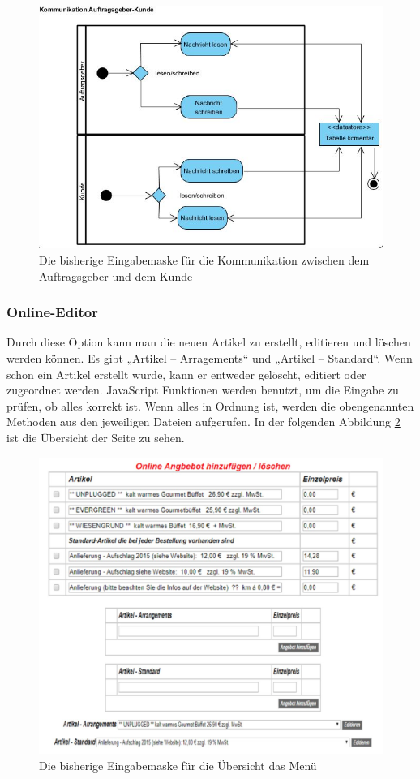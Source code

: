 \begin{figure}[h]
	\centering
	\includegraphics[width=0.7\linewidth]{Graphics/Kommunikation.JPG}
	\caption[Kundeansicht]{Die bisherige Eingabemaske für die Kommunikation zwischen dem Auftragsgeber und dem Kunde}
	\label{fig:Kommunikation Auftraggeber Kunde}
\end{figure}

\subsubsection{Online-Editor}

Durch diese Option kann man die neuen Artikel zu erstellt, editieren und löschen werden können.  Es gibt „Artikel – Arragements“ und „Artikel – Standard“. Wenn schon ein Artikel erstellt wurde, kann er entweder gelöscht, editiert oder zugeordnet werden. 
JavaScript Funktionen werden benutzt, um die Eingabe zu prüfen, ob alles korrekt ist. Wenn alles in Ordnung ist, werden die obengenannten Methoden aus den jeweiligen Dateien aufgerufen. In der folgenden Abbildung \ref{fig: Online-Editor übersicht} ist die Übersicht der Seite zu sehen.
\pagebreak

\begin{figure}[h]
	\centering
	\includegraphics[width=0.7\linewidth]{Graphics/menue-uebesicht.png}
	\caption[Kundeansicht]{Die bisherige Eingabemaske für die Übersicht das Menü}
	\label{fig: Online-Editor übersicht}
\end{figure}

